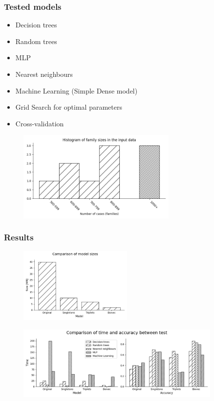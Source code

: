 \documentclass[10pt]{beamer}
\begin{document}
\begin{frame}
\frametitle{Tested models}
\begin{itemize}
\item Decision trees
\item Random trees
\item MLP
\item Nearest neighbours
\item Machine Learning (Simple Dense model)
\end{itemize}

\begin{itemize}
\item Grid Search for optimal parameters
\item Cross-validation
\end{itemize}
\begin{figure}[H]
\begin{center}
\includegraphics[width=0.7\textwidth]{histogram}
\end{center}
\end{figure}
\end{frame}

\begin{frame}
\frametitle{Results}
\begin{figure}[H]
\begin{center}
\includegraphics[width=0.5\textwidth]{sizes}
\end{center}
\end{figure}

\begin{figure}[H]
\begin{center}
\includegraphics[width=0.9\textwidth]{benchmark}
\end{center}
\end{figure}
\end{frame}
\end{document}
